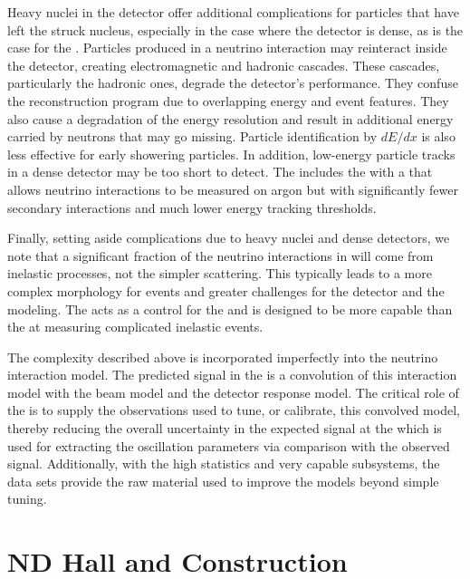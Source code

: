 Heavy nuclei in the detector offer additional complications for particles that have left the struck nucleus, especially in the case where the detector is dense, as is the case for the . Particles produced in a neutrino interaction may  reinteract inside the detector, creating electromagnetic and hadronic cascades. These cascades, particularly the hadronic ones, degrade the detector's performance. They confuse the reconstruction program due to overlapping energy and event features. They also cause a degradation of the energy resolution and result in additional energy carried by neutrons that may go missing. Particle identification by $dE/dx$ is also less effective for early showering particles. In addition, low-energy particle tracks in a dense detector may be too short to detect.  The   includes the  with a  that allows neutrino interactions to be measured on argon but with significantly fewer secondary interactions and much lower energy tracking thresholds.



Finally, setting aside complications due to heavy nuclei and dense detectors, we note that a significant fraction of the neutrino interactions in  will come from inelastic processes, not the simpler  scattering. 
This typically leads to a more complex morphology for events and greater challenges for the detector and the modeling.  The   acts as a control for the  and is designed to be more capable than the  at measuring complicated inelastic events.

The complexity described above is incorporated imperfectly into the neutrino interaction model. The predicted signal in the  is a convolution of this interaction model with the beam model and the detector response model.  The critical role of  the   is to supply the observations used to tune, or calibrate, this convolved model, thereby reducing the overall uncertainty in the expected signal at the  which is used for extracting the oscillation parameters via comparison with the observed signal.  Additionally, with the high statistics and very capable subsystems, the  data sets provide the raw material used to improve the models beyond simple tuning.  



\section{ND Hall and Construction}
\label{sec:exsum-nd-hall}
%


